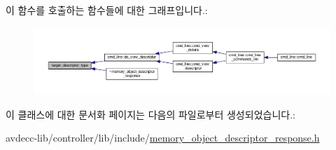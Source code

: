 이 함수를 호출하는 함수들에 대한 그래프입니다.\+:
\nopagebreak
\begin{figure}[H]
\begin{center}
\leavevmode
\includegraphics[width=350pt]{classavdecc__lib_1_1memory__object__descriptor__response_a032532c7dbbccc8502ceb8c8666df8f7_icgraph}
\end{center}
\end{figure}




이 클래스에 대한 문서화 페이지는 다음의 파일로부터 생성되었습니다.\+:\begin{DoxyCompactItemize}
\item 
avdecc-\/lib/controller/lib/include/\hyperlink{memory__object__descriptor__response_8h}{memory\+\_\+object\+\_\+descriptor\+\_\+response.\+h}\end{DoxyCompactItemize}

